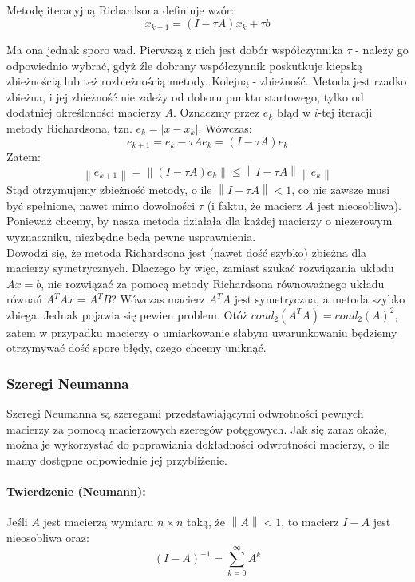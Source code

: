 \documentclass{article}
\newcommand{\norm}[1]{\left\lVert#1\right\rVert}
\begin{document}
Metodę iteracyjną Richardsona definiuje wzór:
\begin{equation}
\label{eq:richardson}
x_{k+1} = (I - \tau A)x_k + \tau b
\end{equation}

Ma ona jednak sporo wad. Pierwszą z nich jest dobór współczynnika $\tau$ - należy go odpowiednio wybrać, gdyż źle dobrany współczynnik poskutkuje kiepską zbieżnością lub też rozbieżnością metody. Kolejną - zbieżność. Metoda jest rzadko zbieżna, i jej zbieżność nie zależy od doboru punktu startowego, tylko od dodatniej określoności macierzy $A$. Oznaczmy przez $e_k$ błąd w $i$-tej iteracji metody Richardsona, tzn. $e_k = |x - x_k|$. Wówczas:
\begin{equation}
e_{k+1} = e_k - \tau A e_k = (I - \tau A) e_k
\end{equation}
Zatem:
\begin{equation}
\norm{e_{k+1}} = \norm{(I - \tau A) e_k} \le \norm{I-\tau A}\norm{e_k}
\end{equation}
Stąd otrzymujemy zbieżność metody, o ile $\norm{I-\tau A} < 1$, co nie zawsze musi być spełnione, nawet mimo dowolności $\tau$ (i faktu, że macierz $A$ jest nieosobliwa). Ponieważ chcemy, by nasza metoda działała dla każdej macierzy o niezerowym wyznaczniku, niezbędne będą pewne usprawnienia. \\

Dowodzi się, że metoda Richardsona jest (nawet dość szybko) zbieżna dla macierzy symetrycznych. Dlaczego by więc, zamiast szukać rozwiązania układu $Ax = b$, nie rozwiązać za pomocą metody Richardsona równoważnego układu równań $A^TAx = A^TB$? Wówczas macierz $A^TA$ jest symetryczna, a metoda szybko zbiega. Jednak pojawia się pewien problem. Otóż $cond_2(A^TA) = cond_2(A)^2$, zatem w przypadku macierzy o umiarkowanie słabym uwarunkowaniu będziemy otrzymywać dość spore błędy, czego chcemy uniknąć.

\subsubsection{Szeregi Neumanna}
Szeregi Neumanna są szeregami przedstawiającymi odwrotności pewnych macierzy za pomocą macierzowych szeregów potęgowych. Jak się zaraz okaże, można je wykorzystać do poprawiania dokładności odwrotności macierzy, o ile mamy dostępne odpowiednie jej przybliżenie.

\paragraph{Twierdzenie (Neumann):} Jeśli $A$ jest macierzą wymiaru $n\times n$ taką, że $\norm{A} < 1$, to macierz $I - A$ jest nieosobliwa oraz: 
\begin{equation}
\label{th:neumann}
(I - A)^{-1} = \sum_{k=0}^{\infty}A^k
\end{equation}
\end{document}
